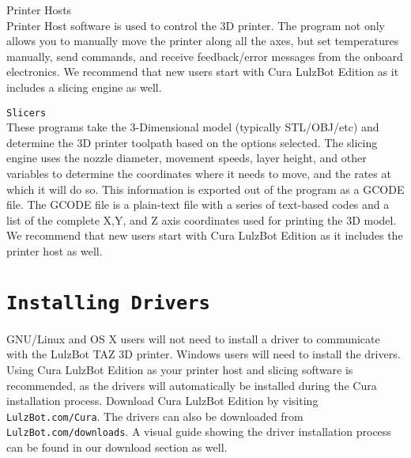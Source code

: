 \begin{description}
\item{Printer Hosts} \hfill \\
Printer Host software is used to control the 3D printer. The program not only allows you to manually move the printer along all the axes, but set temperatures manually, send commands, and receive feedback/error messages from the onboard electronics. We recommend that new users start with Cura LulzBot\textsuperscript{\miniscule{\textregistered}} Edition as it includes a slicing engine as well.

\item{\texttt{Slicers}} \hfill \\
These programs take the 3-Dimensional model (typically STL/OBJ/etc) and determine the 3D printer toolpath based on the options selected. The slicing engine uses the nozzle diameter, movement speeds, layer height, and other variables to determine the coordinates where it needs to move, and the rates at which it will do so. This information is exported out of the program as a GCODE file. The GCODE file is a plain-text file with a series of text-based codes and a list of the complete X,Y, and Z axis coordinates used for printing the 3D model. We recommend that new users start with Cura LulzBot Edition as it includes the printer host as well.


\end{description}

\section{\texttt{Installing Drivers}}
GNU/Linux and OS X users will not need to install a driver to communicate with the LulzBot TAZ 3D printer. Windows users will need to install the drivers. Using Cura LulzBot Edition as your printer host and slicing software is recommended, as the drivers will automatically be installed during the Cura installation process. Download Cura LulzBot Edition by visiting \texttt{LulzBot.com/Cura}. The drivers can also be downloaded from \texttt{LulzBot.com/downloads}. A visual guide showing the driver installation process can be found in our download section as well.


